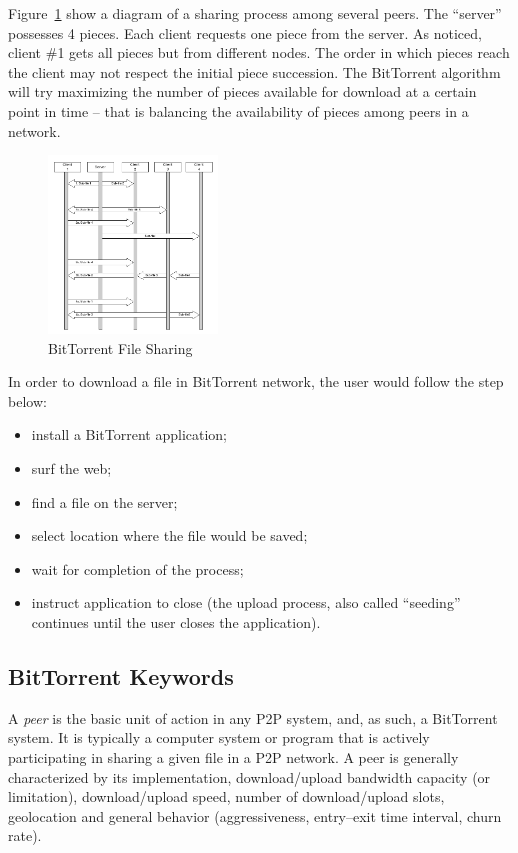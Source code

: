 Figure~\ref{fig:p2p-systems:bittorrent-sharing} show a diagram of a sharing
process among several peers. The ``server'' possesses 4 pieces. Each client
requests one piece from the server. As noticed, client \#1 gets all pieces
but from different nodes. The order in which pieces reach the client may not respect
the initial piece succession. The BitTorrent algorithm will try maximizing the
number of pieces available for download at a certain point in time -- that is
balancing the availability of pieces among peers in a network.

\begin{figure}
  \centering
  \includegraphics[width=0.4\textwidth]{src/img/p2p-systems/bittorrent-sharing}
  \caption{BitTorrent File Sharing}
  \label{fig:p2p-systems:bittorrent-sharing}
\end{figure}

In order to download a file in BitTorrent network, the user would follow the
step below:

\begin{itemize}
  \item install a BitTorrent application;
  \item surf the web;
  \item find a file on the server;
  \item select location where the file would be saved;
  \item wait for completion of the process;
  \item instruct application to close (the upload process, also called
  ``seeding'' continues until the user closes the application).
\end{itemize}

\subsection{BitTorrent Keywords}

A \textit{peer} is the basic unit of action in any P2P system, and, as such, a
BitTorrent system. It is typically a computer system or program that is
actively participating in sharing a given file in a P2P network. A peer is
generally characterized by its implementation, download/upload bandwidth
capacity (or limitation), download/upload speed, number of download/upload
slots, geolocation and general behavior (aggressiveness, entry--exit time
interval, churn rate).

